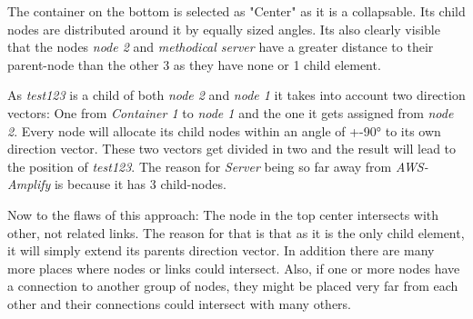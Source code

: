 The container on the bottom is selected as "Center" as it is a collapsable. Its child nodes are distributed around it by equally sized angles. Its also clearly visible that the nodes \emph{node 2} and \emph{methodical server} have a greater distance to their parent-node than the other 3 as they have none or 1 child element.

As \emph{test123} is a child of both \emph{node 2} and \emph{node 1} it takes into account two direction vectors: One from \emph{Container 1} to \emph{node 1} and the one it gets assigned from \emph{node 2}. Every node will allocate its child nodes within an angle of +-90° to its own direction vector. These two vectors get divided in two and the result will lead to the position of \emph{test123}. The reason for \emph{Server} being so far away from \emph{AWS-Amplify} is because it has 3 child-nodes.

Now to the flaws of this approach: The node in the top center intersects with other, not related links. The reason for that is that as it is the only child element, it will simply extend its parents direction vector.
In addition there are many more places where nodes or links could intersect. Also, if one or more nodes have a connection to another group of nodes, they might be placed very far from each other and their connections could intersect with many others.

